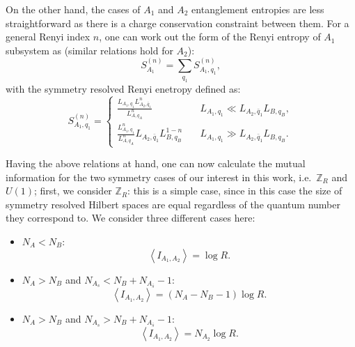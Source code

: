 \documentclass[aps,pra,reprint,superscriptaddress,twocolumn,notitlepage]{revtex4-1}
\numberwithin{equation}{section}
\begin{document}
On the other hand, the cases of $A_1$ and $A_2$ entanglement entropies are less straightforward as there is a charge conservation constraint between them. For a general Renyi index $n$, one can work out the form of the Renyi entropy of $A_1$ subsystem as (similar relations hold for $A_2$):
\begin{equation}
    S_{A_1}^{(n)} = \sum_{q_1} S_{A_1,q_1}^{(n)},
\end{equation}
with the symmetry resolved Renyi enetropy defined as:
\begin{equation}
    S_{A_1,q_1}^{(n)} = \begin{cases}
      \frac{L_{A_1,q_1} L_{A_2,\bar{q}_1}^n}{L_{A,q_A}^n}  & \quad L_{A_1,q_1} \ll L_{A_2,\bar{q}_1} L_{B,q_B},\\
      \frac{L_{A_1,q_1}^n}{L_{A,q_A}^n} L_{A_2,\bar{q}_1} L_{B,q_B}^{1-n} & \quad L_{A_1,q_1} \gg L_{A_2,\bar{q}_1} L_{B,q_B}.
    \end{cases}
\end{equation}

Having the above relations at hand, one can now calculate the mutual information for the two symmetry cases of our interest in this work, i.e.~$\mathbb{Z}_R$ and $U(1)$; first, we consider $\mathbb{Z}_R$: this is a simple case, since in this case the size of symmetry resolved Hilbert spaces are equal regardless of the quantum number they correspond to. We consider three different cases here:
\begin{itemize}
    \item $N_A < N_B$:
    \begin{equation}
        \left\langle     I_{A_1,A_2}\right\rangle = \log  R.
    \end{equation}
    \item $N_A > N_B$ and $N_{A_{s}} < N_B + N_{A_{\bar{s}}} - 1$:
    \begin{equation}
        \left\langle     I_{A_1,A_2}\right\rangle = (N_A-N_B-1)\log  R.
    \end{equation}
    \item $N_A > N_B$ and $N_{A_{s}} > N_B + N_{A_{\bar{s}}} - 1$:
    \begin{equation}
        \left\langle     I_{A_1,A_2}\right\rangle = N_{A_2}\log  R.
    \end{equation}
\end{itemize}
  
\end{document}
